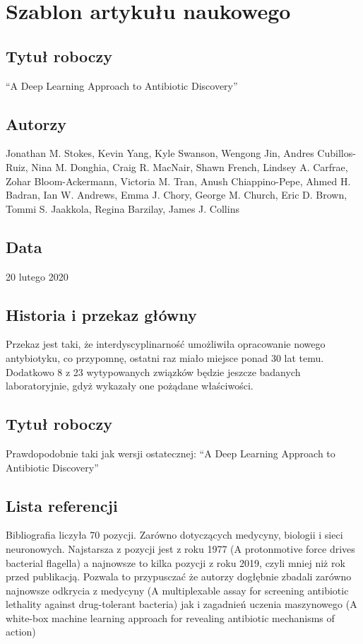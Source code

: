 \section{Szablon artykułu naukowego}

\subsection{Tytuł roboczy}
“A Deep Learning Approach to Antibiotic Discovery”

\subsection{Autorzy}
Jonathan M. Stokes, Kevin Yang, Kyle Swanson, Wengong Jin, Andres Cubillos-Ruiz, Nina M. Donghia, Craig R. MacNair, Shawn French, Lindsey A. Carfrae, Zohar Bloom-Ackermann, Victoria M. Tran, Anush Chiappino-Pepe, Ahmed H. Badran, Ian W. Andrews, Emma J. Chory, George M. Church, Eric D. Brown, Tommi S. Jaakkola, Regina Barzilay, James J. Collins

\subsection{Data}
20 lutego 2020

\subsection{Historia i przekaz główny}
Przekaz jest taki, że interdyscyplinarność umożliwiła opracowanie nowego antybiotyku, co przypomnę, ostatni raz miało miejsce ponad 30 lat temu. Dodatkowo 8 z 23 wytypowanych związków będzie jeszcze badanych laboratoryjnie, gdyż wykazały one pożądane właściwości.

\subsection{Tytuł roboczy}
Prawdopodobnie taki jak wersji ostatecznej: “A Deep Learning Approach to Antibiotic Discovery”

\subsection{Lista referencji}
Bibliografia liczyła 70 pozycji. Zarówno dotyczących medycyny, biologii i sieci neuronowych. Najstarsza z pozycji jest z roku 1977 (A protonmotive force drives bacterial flagella) a najnowsze to kilka pozycji z roku 2019, czyli mniej niż rok przed publikacją. Pozwala to przypusczać że autorzy dogłębnie zbadali zarówno najnowsze odkrycia z medycyny (A multiplexable assay for screening antibiotic lethality against drug-tolerant bacteria) jak i zagadnień uczenia maszynowego (A white-box machine learning approach for revealing antibiotic mechanisms of action)

